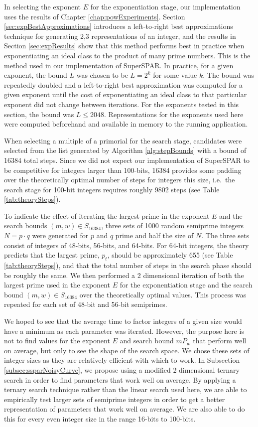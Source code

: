 \documentclass{ucalgthes1}
\theoremstyle{definition}
\begin{document}
In selecting the exponent $E$ for the exponentiation stage, our implementation uses the results of Chapter \ref{chap:powExperiments}.  Section \ref{sec:expBestApproximations} introduces a left-to-right best approximations technique for generating 2,3 representations of an integer, and the results in Section \ref{sec:expResults} show that this method performs best in practice when exponentiating an ideal class to the product of many prime numbers.  This is the method used in our implementation of SuperSPAR.  In practice, for a given exponent, the bound $L$ was chosen to be $L=2^k$ for some value $k$.  The bound was repeatedly doubled and a left-to-right best approximation was computed for a given exponent until the cost of exponentiating an ideal class to that particular exponent did not change between iterations.  For the exponents tested in this section, the bound was $L \le 2048$.  Representations for the exponents used here were computed beforehand and available in memory to the running application.

When selecting a multiple of a primorial for the search stage, candidates were selected from the list generated by Algorithm \ref{alg:stepBounds} with a bound of 16384 total steps.  Since we did not expect our implementation of SuperSPAR to be competitive for integers larger than 100-bits, 16384 provides some padding over the theoretically optimal number of steps for integers this size, i.e.\ the search stage for 100-bit integers requires roughly 9802 steps (see Table \ref{tab:theorySteps}).

To indicate the effect of iterating the largest prime in the exponent $E$ and the search bounds $(m, w) \in S_{16384}$, three sets of 1000 random semiprime integers $N = p \cdot q$ were generated for $p$ and $q$ prime and half the size of $N$.  The three sets consist of integers of 48-bits, 56-bits, and 64-bits.  For 64-bit integers, the theory predicts that the largest prime, $p_t$, should be approximately 655 (see Table \ref{tab:theorySteps}), and that the total number of steps in the search phase should be roughly the same.  We then performed a 2 dimensional iteration of both the largest prime used in the exponent $E$ for the exponentiation stage and the search bound $(m, w) \in S_{16384}$ over the theoretically optimal values.  This process was repeated for each set of 48-bit and 56-bit semiprimes.

We hoped to see that the average time to factor integers of a given size would have a minimum as each parameter was iterated.  However, the purpose here is not to find values for the exponent $E$ and search bound $mP_w$ that perform well on average, but only to see the shape of the search space.  We chose these sets of integer sizes as they are relatively efficient with which to work.  In Subsection \ref{subsec:ssparNoisyCurve}, we propose using a modified 2 dimensional ternary search in order to find parameters that work well on average.  By applying a ternary search technique rather than the linear search used here, we are able to empirically test larger sets of semiprime integers in order to get a better representation of parameters that work well on average.  We are also able to do this for every even integer size in the range 16-bits to 100-bits.
\end{document}
